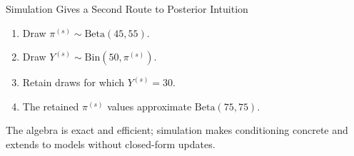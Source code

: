 \documentclass[aspectratio=43,11pt]{beamer}
\begin{document}
\begin{frame}{Simulation Gives a Second Route to Posterior Intuition}
  \begin{enumerate}
    \item Draw $\pi^{(s)}\sim\mathrm{Beta}(45,55)$.
    \item Draw $Y^{(s)}\sim\mathrm{Bin}(50,\pi^{(s)})$.
    \item Retain draws for which $Y^{(s)}=30$.
    \item The retained $\pi^{(s)}$ values approximate $\mathrm{Beta}(75,75)$.
  \end{enumerate}
  \begin{block}{}
    The algebra is exact and efficient; simulation makes conditioning concrete and extends to models without closed-form updates.
  \end{block}
\end{frame}

\end{document}
